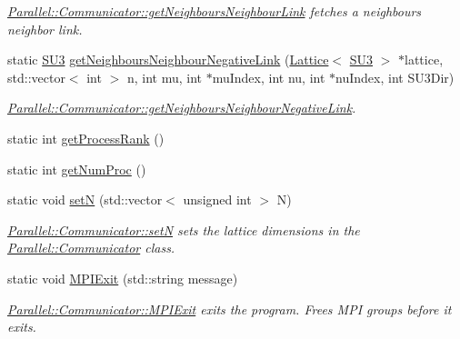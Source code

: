\begin{DoxyCompactItemize}
\begin{DoxyCompactList}\small\item\em \mbox{\hyperlink{class_parallel_1_1_communicator_a27862560cf6c7b8ccf650a422e014776}{Parallel\+::\+Communicator\+::get\+Neighbours\+Neighbour\+Link}} fetches a neighbours neighbor link. \end{DoxyCompactList}\item 
static \mbox{\hyperlink{class_s_u3}{S\+U3}} \mbox{\hyperlink{class_parallel_1_1_communicator_a1c598fae96e05e3b36db368e60453d63}{get\+Neighbours\+Neighbour\+Negative\+Link}} (\mbox{\hyperlink{class_lattice}{Lattice}}$<$ \mbox{\hyperlink{class_s_u3}{S\+U3}} $>$ $\ast$lattice, std\+::vector$<$ int $>$ n, int mu, int $\ast$mu\+Index, int nu, int $\ast$nu\+Index, int S\+U3\+Dir)
\begin{DoxyCompactList}\small\item\em \mbox{\hyperlink{class_parallel_1_1_communicator_a1c598fae96e05e3b36db368e60453d63}{Parallel\+::\+Communicator\+::get\+Neighbours\+Neighbour\+Negative\+Link}}. \end{DoxyCompactList}\item 
static int \mbox{\hyperlink{class_parallel_1_1_communicator_a474ab433da0e83ef372d74e26a7e5cb0}{get\+Process\+Rank}} ()
\item 
static int \mbox{\hyperlink{class_parallel_1_1_communicator_a7b1f80fb49a0cc83f2031c3415174150}{get\+Num\+Proc}} ()
\item 
static void \mbox{\hyperlink{class_parallel_1_1_communicator_a1db417babab93c8d8bf6339ff2bab540}{setN}} (std\+::vector$<$ unsigned int $>$ N)
\begin{DoxyCompactList}\small\item\em \mbox{\hyperlink{class_parallel_1_1_communicator_a1db417babab93c8d8bf6339ff2bab540}{Parallel\+::\+Communicator\+::setN}} sets the lattice dimensions in the \mbox{\hyperlink{class_parallel_1_1_communicator}{Parallel\+::\+Communicator}} class. \end{DoxyCompactList}\item 
static void \mbox{\hyperlink{class_parallel_1_1_communicator_a57bb28ee8dbc4efd708a2695423778c4}{M\+P\+I\+Exit}} (std\+::string message)
\begin{DoxyCompactList}\small\item\em \mbox{\hyperlink{class_parallel_1_1_communicator_a57bb28ee8dbc4efd708a2695423778c4}{Parallel\+::\+Communicator\+::\+M\+P\+I\+Exit}} exits the program. Frees M\+PI groups before it exits. \end{DoxyCompactList}\item 

\end{DoxyCompactItemize}
